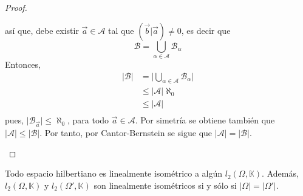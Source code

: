 \documentclass[12pt]{report}
\theoremstyle{largebreak}
\newcommand\abs[1]{\ensuremath{\big|#1\big|}}
\newcommand\pint[2]{\ensuremath{\left(#1\big| #2\right)}}
\begin{document}
\begin{proof}
\begin{enumerate}
            así que, debe existir $\vec{a}\in\mathcal{A}$ tal que $\pint{\vec{b}}{\vec{a}}\neq0$, es decir que
            \begin{equation*}
                \mathcal{B}=\bigcup_{\alpha\in\mathcal{A}}\mathcal{B}_\alpha
            \end{equation*}
            Entonces,
            \begin{equation*}
                \begin{split}
                    \abs{\mathcal{B}}&=\abs{\bigcup_{\alpha\in\mathcal{A}}\mathcal{B}_\alpha}\\
                    &\leq\abs{\mathcal{A}}\aleph_0\\
                    &\leq\abs{\mathcal{A}}\\
                \end{split}
            \end{equation*}
            pues, $\abs{\mathcal{B}_{\vec{a}}}\leq\aleph_0$, para todo $\vec{a}\in\mathcal{A}$. Por simetría se obtiene también que $\abs{\mathcal{A}}\leq\abs{\mathcal{B}}$. Por tanto, por Cantor-Bernstein se sigue que $\abs{\mathcal{A}}=\abs{\mathcal{B}}$.
        \end{enumerate}
    \end{proof}

    \begin{theor}
        Todo espacio hilbertiano es linealmente isométrico a algún $l_2(\Omega,\mathbb{K})$. Además, $l_2(\Omega,\mathbb{K})$ y $l_2(\Omega',\mathbb{K})$ son linealmente isométricos si y sólo si $\abs{\Omega}=\abs{\Omega'}$.
    \end{theor}
\end{document}
